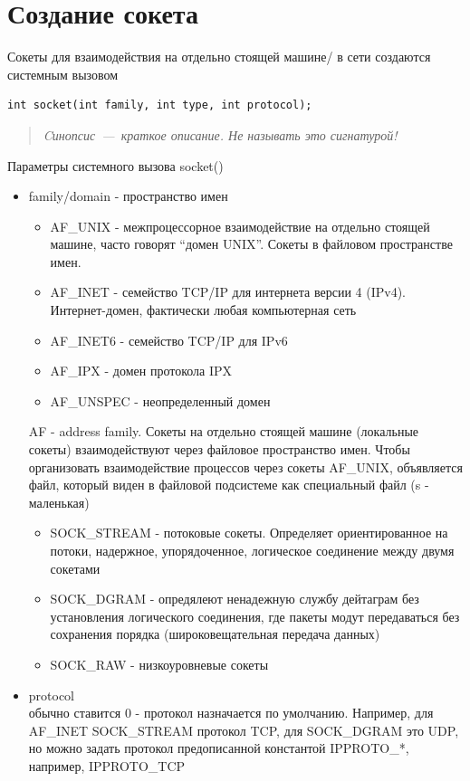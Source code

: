 \section{Создание сокета}

Сокеты для взаимодействия на отдельно стоящей машине/ в сети создаются системным вызовом

\begin{lstlisting}
int socket(int family, int type, int protocol);
\end{lstlisting}

\begin{quote}
\textit{Cинопсис~---~краткое описание. Не называть это сигнатурой!}
\end{quote}


Параметры системного вызова socket()

\begin{itemize}
\item family/domain - пространство имен
\begin{itemize}
\item AF\_UNIX - межпроцессорное взаимодействие на отдельно стоящей машине, часто говорят “домен UNIX”. Сокеты в файловом пространстве имен. 
\item AF\_INET - семейство TCP/IP для интернета версии 4 (IPv4). Интернет-домен, фактически любая компьютерная сеть
\item AF\_INET6 - семейство TCP/IP для IPv6
\item AF\_IPX - домен протокола IPX
\item AF\_UNSPEC - неопределенный домен
\end{itemize} 
AF - address family. Сокеты на отдельно стоящей машине (локальные сокеты) взаимодействуют через файловое пространство имен. Чтобы организовать взаимодействие процессов через сокеты AF\_UNIX, объявляется файл, который виден в файловой подсистеме как специальный файл (s - маленькая)
\begin{itemize}
\item SOCK\_STREAM - потоковые сокеты. Определяет ориентированное на потоки, надержное, упорядоченное, логическое соединение между двумя сокетами
\item SOCK\_DGRAM - опредялеют ненадежную службу дейтаграм без установления логического соединения, где пакеты модут передаваться без сохранения порядка (широковещательная передача данных)
\item SOCK\_RAW - низкоуровневые сокеты
\end{itemize}
\item protocol \\ 
обычно ставится 0 - протокол назначается по умолчанию. Например, для AF\_INET SOCK\_STREAM протокол TCP, для SOCK\_DGRAM это UDP, но можно задать протокол предописанной константой IPPROTO\_*, например, IPPROTO\_TCP
\end{itemize}

